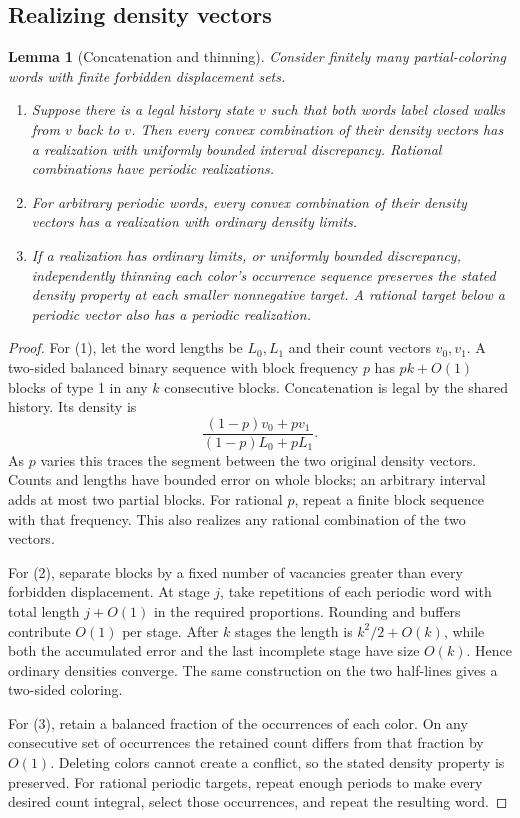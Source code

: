 \documentclass[11pt,reqno]{amsart}
\theoremstyle{plain}
\newtheorem{lemma}[theorem]{Lemma}
\theoremstyle{plain}
\theoremstyle{plain}
\begin{document}
\subsection{Realizing density vectors}\label{M-sec:realization}
\begin{lemma}[Concatenation and thinning]\label{M-lem:density-realization}
Consider finitely many partial-coloring words with finite forbidden
displacement sets.
\begin{enumerate}
\item Suppose there is a legal history state $v$ such that both words label
closed walks from $v$ back to $v$. Then every convex
combination of their density vectors has a realization with uniformly
bounded interval discrepancy. Rational combinations have periodic
realizations.
\item For arbitrary periodic words, every convex combination of their
density vectors has a realization with ordinary density limits.
\item If a realization has ordinary limits, or uniformly bounded
discrepancy, independently thinning each color's occurrence sequence
preserves the stated density property at each smaller nonnegative target. A rational
target below a periodic vector also has a periodic realization.
\end{enumerate}
\end{lemma}
\begin{proof}
For (1), let the word lengths be $L_0,L_1$ and their count vectors
$v_0,v_1$. A two-sided balanced binary sequence with block frequency
$p$ has $pk+O(1)$ blocks of type 1 in any $k$ consecutive blocks.
Concatenation is legal by the shared history. Its density is
\[
 \frac{(1-p)v_0+pv_1}{(1-p)L_0+pL_1}.
\]
As $p$ varies this traces the segment between the two original
density vectors. Counts and lengths have bounded error on whole
blocks; an arbitrary interval adds at most two partial blocks.
For rational $p$, repeat a finite block sequence with that frequency.
This also realizes any rational combination of the two vectors.

For (2), separate blocks by a fixed number of vacancies greater than
every forbidden displacement. At stage $j$, take repetitions of each
periodic word with total length $j+O(1)$ in the required proportions.
Rounding and buffers contribute $O(1)$ per stage. After $k$ stages
the length is $k^2/2+O(k)$, while both the accumulated error and the
last incomplete stage have size $O(k)$. Hence ordinary densities
converge. The same construction on the two half-lines gives a
two-sided coloring.

For (3), retain a balanced fraction of the occurrences of each color.
On any consecutive set of occurrences the retained count differs
from that fraction by $O(1)$. Deleting colors cannot create a
conflict, so the stated density property is preserved. For rational
periodic targets, repeat enough periods to make every desired count
integral, select those occurrences, and repeat the resulting word.
\end{proof}
\end{document}

